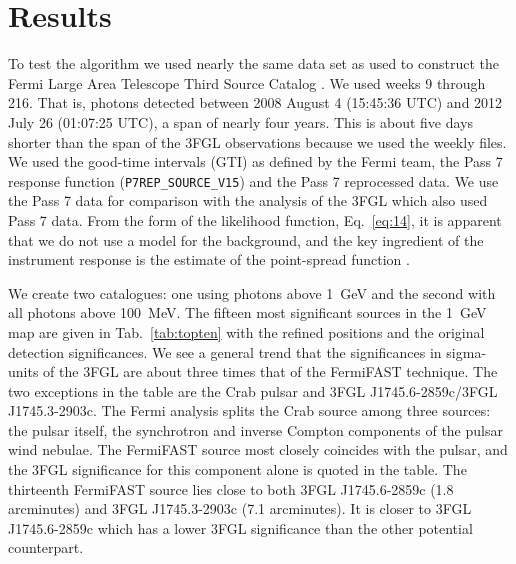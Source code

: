 \documentclass[useAMS,usenatbib]{mn2e}
\begin{document}
\section{Results}
\label{sec:results}

To test the algorithm we used nearly the same data set as used to
construct the Fermi Large Area Telescope Third Source Catalog
\cite[3FGL][]{2015ApJS..218...23A}.  We used weeks 9 through 216. That
is, photons detected between 2008 August 4 (15:45:36 UTC) and 2012
July 26 (01:07:25 UTC), a span of nearly four years.  This is about
five days shorter than the span of the 3FGL observations because we
used the weekly files.  We used the good-time intervals (GTI) as
defined by the Fermi team, the Pass 7 response function
(\texttt{P7REP\_SOURCE\_V15}) and the Pass 7 reprocessed data.  We use
the Pass 7 data for comparison with the analysis of the 3FGL which
also used Pass 7 data. From the form of the likelihood function,
Eq.~\ref{eq:14}, it is apparent that we do not use a model for the
background, and the key ingredient of the instrument response is the
estimate of the point-spread function \citep{2012ApJS..203....4A}.

We create two catalogues: one using photons above 1~GeV and the second
with all photons above 100~MeV.  The fifteen most significant sources in
the 1~GeV map are given in Tab.~\ref{tab:topten} with the refined
positions and the original detection significances.  We see a general
trend that the significances in sigma-units of the 3FGL are about
three times that of the FermiFAST technique.  The two exceptions in
the table are the Crab pulsar and 3FGL J1745.6-2859c/3FGL
J1745.3-2903c.  The Fermi analysis splits the Crab source among three
sources: the pulsar itself, the synchrotron and inverse Compton
components of the pulsar wind nebulae.  The FermiFAST source most
closely coincides with the pulsar, and the 3FGL significance for this
component alone is quoted in the table.  The thirteenth FermiFAST
source lies close to both 3FGL J1745.6-2859c (1.8 arcminutes) and 3FGL
J1745.3-2903c (7.1 arcminutes).  It is closer to 3FGL
J1745.6-2859c which has a lower 3FGL significance than the other
potential counterpart.
%
%
\end{document}
